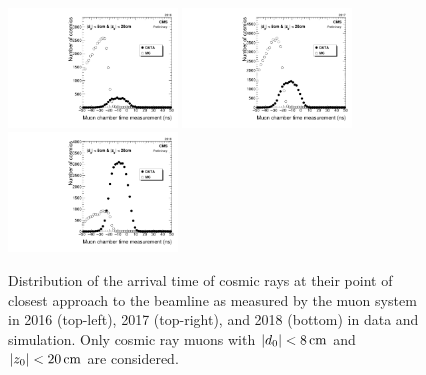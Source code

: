 \begin{figure}[hbtp]
\centering
\includegraphics[width=0.4\textwidth]{figures/tracking_eff/2016/Muon2TimeAve.pdf}
\includegraphics[width=0.4\textwidth]{figures/tracking_eff/2017/Muon2TimeAve.pdf}
\includegraphics[width=0.4\textwidth]{figures/tracking_eff/2018/Muon2TimeAve.pdf}
\caption{Distribution of the arrival time of cosmic rays at their point of closest approach to the beamline as measured by the muon system in 2016 (top-left), 2017 (top-right), and 2018 (bottom) in data and simulation. Only cosmic ray muons with $\ad<\SI{8}{\cm}$ and $\az<\SI{20}{\cm}$ are considered.}
\label{arrival_time}
\end{figure}

